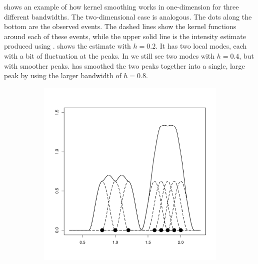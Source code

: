  shows an example of how \gls{kernel} smoothing works in  one-dimension for three different bandwidths.
The two-dimensional case is analogous.
The dots along the bottom are the observed \glspl{event}.
The dashed lines show the \gls{kernel} functions around each of these \glspl{event},
while the upper solid line is the \gls{intensity} estimate produced using .
 shows the estimate with $h=0.2$.
It has two local modes, each with a bit of fluctuation at the peaks.
In  we still see two modes with $h=0.4$, but with smoother peaks.
 has smoothed the two peaks together into a single,
large peak by using the larger bandwidth of $h=0.8$.

\begin{figure}[htbp]
    \centering
    \begin{subfigure}[t]{0.32\textwidth}
        \includegraphics[width=\textwidth]{img/kernel1d-02}
        \label{fig:theory:kernel1d:02}
    \end{subfigure}
    \begin{subfigure}[t]{0.32\textwidth}

\end{subfigure}
\end{figure}
